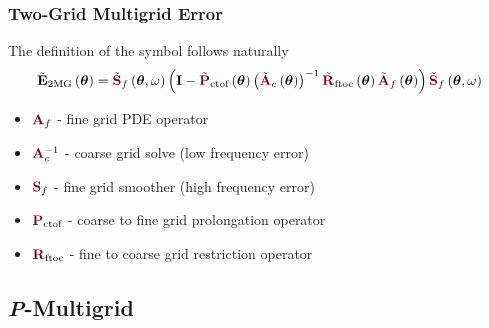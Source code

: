 \documentclass{beamer}
\begin{document}
\begin{frame}
\begin{center}
\frametitle{Two-Grid Multigrid Error}

The definition of the symbol follows naturally\\

\begin{equation}
\tilde{\mathbf{E}}_{\text{2MG}} \left( \boldsymbol{\theta} \right) = \tilde{{\color{burgundy}\mathbf{S}}}_f \left( \boldsymbol{\theta}, \omega \right) \left( \mathbf{I} - \tilde{{\color{burgundy}\mathbf{P}}}_{\text{ctof}} \left( \boldsymbol{\theta} \right) \left(\tilde{{\color{burgundy}\mathbf{A}}}_c \left( \boldsymbol{\theta} \right) \right)^{-1} \tilde{{\color{burgundy}\mathbf{R}}}_{\text{ftoc}} \left( \boldsymbol{\theta} \right) \tilde{{\color{burgundy}\mathbf{A}}}_f \left( \boldsymbol{\theta} \right) \right) \tilde{{\color{burgundy}\mathbf{S}}}_f \left( \boldsymbol{\theta}, \omega \right)
\end{equation}

\begin{itemize}

\item ${\color{burgundy}\mathbf{A}}_f$ - fine grid PDE operator

\item ${\color{burgundy}\mathbf{A}}_c^{-1}$ - coarse grid solve (low frequency error)

\item ${\color{burgundy}\mathbf{S}}_f$ - fine grid smoother (high frequency error)

\item ${\color{burgundy}\mathbf{P}}_{\text{ctof}}$ - coarse to fine grid prolongation operator

\item ${\color{burgundy}\mathbf{R}}_{\text{ftoc}}$ - fine to coarse grid restriction operator

\end{itemize}

\end{center}
\end{frame}


\subsection{{\textit P}-Multigrid}
\end{document}
